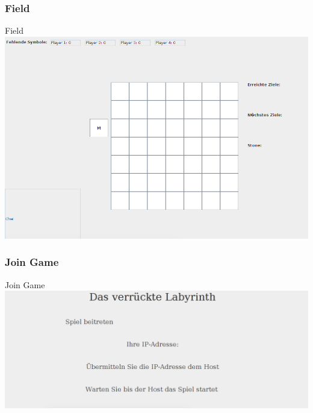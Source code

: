 \documentclass{beamer}
\begin{document}
		    \label{Frame3}	
			\begin{frame}
				\frametitle{Field}
				\begin{block}{Field}
					\includegraphics[scale=0.27]{Bilder/bild3.png}
				\end{block}		
			\end{frame}
		    \label{Frame4}	
			\begin{frame}
				\frametitle{Join Game}
				\begin{block}{Join Game}
					\includegraphics[scale=0.25]{Bilder/bild4.png}
				\end{block}		
			\end{frame}
\end{document}
